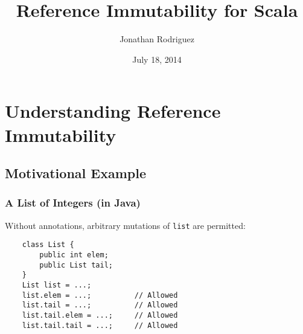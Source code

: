 \documentclass{beamer}
\newcommand{\code}[1]{\lstinline$#1$}
\begin{document}
	
	\title{Reference Immutability for Scala}
	\author{Jonathan Rodriguez}
	\date{July 18, 2014}
	\frame{\titlepage}
	

%

\section{Understanding Reference Immutability}

	\subsection{Motivational Example}

\def\redcolor{\color{red}}
\def\greencolor{\color{green!60!black}}
\def\bluecolor{\color{blue}}
\def\blackcolor{\color{black}}

\begin{frame}[containsverbatim]
\frametitle{A List of Integers (in Java)}
Without annotations, arbitrary mutations of \code{list} are permitted:
\begin{lstlisting}
	class List {
		public int elem;
		public List tail;
	}
	List list = ...;
	list.elem = ...;          // Allowed
	list.tail = ...;          // Allowed
	list.tail.elem = ...;     // Allowed
	list.tail.tail = ...;     // Allowed
\end{lstlisting}
\end{frame}
\end{document}
